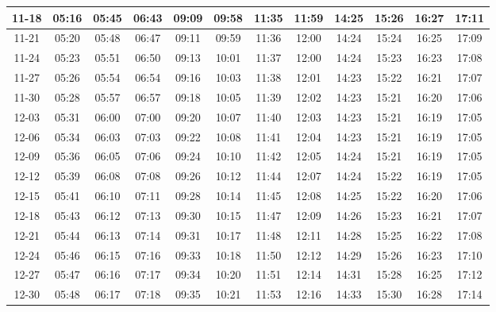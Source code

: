 \begin{footnotesize}
\begin{tabular}{c | c | c| c| c| c| c| c| c| c| c| c}
		11-18&05:16&05:45&06:43&09:09&09:58&11:35&11:59&14:25&15:26&16:27&17:11\\\hline
		11-21&05:20&05:48&06:47&09:11&09:59&11:36&12:00&14:24&15:24&16:25&17:09\\\hline
		11-24&05:23&05:51&06:50&09:13&10:01&11:37&12:00&14:24&15:23&16:23&17:08\\\hline
		11-27&05:26&05:54&06:54&09:16&10:03&11:38&12:01&14:23&15:22&16:21&17:07\\\hline
		11-30&05:28&05:57&06:57&09:18&10:05&11:39&12:02&14:23&15:21&16:20&17:06\\\hline
		12-03&05:31&06:00&07:00&09:20&10:07&11:40&12:03&14:23&15:21&16:19&17:05\\\hline
		12-06&05:34&06:03&07:03&09:22&10:08&11:41&12:04&14:23&15:21&16:19&17:05\\\hline
		12-09&05:36&06:05&07:06&09:24&10:10&11:42&12:05&14:24&15:21&16:19&17:05\\\hline
		12-12&05:39&06:08&07:08&09:26&10:12&11:44&12:07&14:24&15:22&16:19&17:05\\\hline
		12-15&05:41&06:10&07:11&09:28&10:14&11:45&12:08&14:25&15:22&16:20&17:06\\\hline
		12-18&05:43&06:12&07:13&09:30&10:15&11:47&12:09&14:26&15:23&16:21&17:07\\\hline
		12-21&05:44&06:13&07:14&09:31&10:17&11:48&12:11&14:28&15:25&16:22&17:08\\\hline
		12-24&05:46&06:15&07:16&09:33&10:18&11:50&12:12&14:29&15:26&16:23&17:10\\\hline
		12-27&05:47&06:16&07:17&09:34&10:20&11:51&12:14&14:31&15:28&16:25&17:12\\\hline
		12-30&05:48&06:17&07:18&09:35&10:21&11:53&12:16&14:33&15:30&16:28&17:14\\\hline
	\end{tabular}
\end{footnotesize}